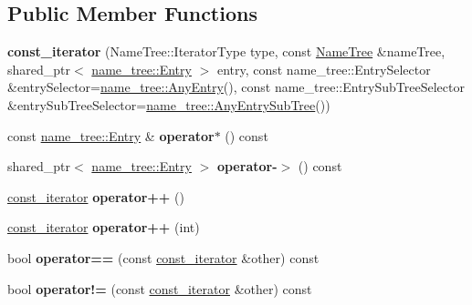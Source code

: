 \subsection*{Public Member Functions}
\begin{DoxyCompactItemize}
\item 
{\bfseries const\+\_\+iterator} (Name\+Tree\+::\+Iterator\+Type type, const \hyperlink{classnfd_1_1NameTree}{Name\+Tree} \&name\+Tree, shared\+\_\+ptr$<$ \hyperlink{classnfd_1_1name__tree_1_1Entry}{name\+\_\+tree\+::\+Entry} $>$ entry, const name\+\_\+tree\+::\+Entry\+Selector \&entry\+Selector=\hyperlink{structnfd_1_1name__tree_1_1AnyEntry}{name\+\_\+tree\+::\+Any\+Entry}(), const name\+\_\+tree\+::\+Entry\+Sub\+Tree\+Selector \&entry\+Sub\+Tree\+Selector=\hyperlink{structnfd_1_1name__tree_1_1AnyEntrySubTree}{name\+\_\+tree\+::\+Any\+Entry\+Sub\+Tree}())\hypertarget{classnfd_1_1NameTree_1_1const__iterator_abb7f85cf0340b585c93b2a501fd00718}{}\label{classnfd_1_1NameTree_1_1const__iterator_abb7f85cf0340b585c93b2a501fd00718}

\item 
const \hyperlink{classnfd_1_1name__tree_1_1Entry}{name\+\_\+tree\+::\+Entry} \& {\bfseries operator$\ast$} () const\hypertarget{classnfd_1_1NameTree_1_1const__iterator_a6d542f54befe4368d14be8316567ab39}{}\label{classnfd_1_1NameTree_1_1const__iterator_a6d542f54befe4368d14be8316567ab39}

\item 
shared\+\_\+ptr$<$ \hyperlink{classnfd_1_1name__tree_1_1Entry}{name\+\_\+tree\+::\+Entry} $>$ {\bfseries operator-\/$>$} () const\hypertarget{classnfd_1_1NameTree_1_1const__iterator_a0727b26c3643420a76d51743e24f0cfa}{}\label{classnfd_1_1NameTree_1_1const__iterator_a0727b26c3643420a76d51743e24f0cfa}

\item 
\hyperlink{classnfd_1_1NameTree_1_1const__iterator}{const\+\_\+iterator} {\bfseries operator++} ()\hypertarget{classnfd_1_1NameTree_1_1const__iterator_acd15eff86d8f27105491b830d0326447}{}\label{classnfd_1_1NameTree_1_1const__iterator_acd15eff86d8f27105491b830d0326447}

\item 
\hyperlink{classnfd_1_1NameTree_1_1const__iterator}{const\+\_\+iterator} {\bfseries operator++} (int)\hypertarget{classnfd_1_1NameTree_1_1const__iterator_a24961c65b516d04b2128e31ee194f60c}{}\label{classnfd_1_1NameTree_1_1const__iterator_a24961c65b516d04b2128e31ee194f60c}

\item 
bool {\bfseries operator==} (const \hyperlink{classnfd_1_1NameTree_1_1const__iterator}{const\+\_\+iterator} \&other) const\hypertarget{classnfd_1_1NameTree_1_1const__iterator_a67a4f7d31923748ec6fe0915f8eaeb88}{}\label{classnfd_1_1NameTree_1_1const__iterator_a67a4f7d31923748ec6fe0915f8eaeb88}

\item 
bool {\bfseries operator!=} (const \hyperlink{classnfd_1_1NameTree_1_1const__iterator}{const\+\_\+iterator} \&other) const\hypertarget{classnfd_1_1NameTree_1_1const__iterator_a688ce98d669f5edf7212e6398b93dddc}{}\label{classnfd_1_1NameTree_1_1const__iterator_a688ce98d669f5edf7212e6398b93dddc}

\end{DoxyCompactItemize}
